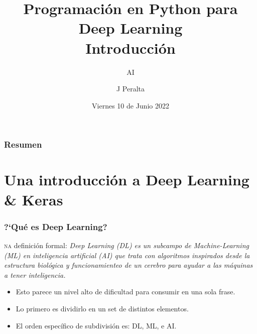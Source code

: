 \documentclass[9pt, xcolor=svgnames, dvipsnames]{beamer}
\title[\mycode]{Programación en Python para Deep Learning\\ Introducción}
\subtitle{AI}
\begin{document}



\author{J Peralta} %
\date{Viernes 10 de Junio 2022}

\begin{frame}
\titlepage %
\end{frame}

\begin{frame}
\frametitle{Resumen} %
\tableofcontents %
\end{frame}



%
%
%
\section{Una introducci\'on a Deep Learning \& Keras}

\begin{frame}[fragile]
\frametitle{?`Qu\'e es Deep Learning?}
\lettrine[lines=3]{\gothfamily\fontsize{50}{60}}{na} definici\'on formal: \textit{Deep Learning (DL) es un subcampo de Machine-Learning (ML) en inteligencia artificial (AI) que trata con algoritmos inspirados desde la estructura biol\'ogica y funcionamienteo de un cerebro para ayudar a las m\'aquinas a tener inteligencia.}
\begin{itemize}
    \item Esto parece un nivel alto de dificultad para consumir en una sola frase.
    \item Lo primero es dividirlo en un set de distintos elementos.
    \item El orden espec\'ifico de subdivisi\'on es: DL, ML, e AI.
\end{itemize}
\end{frame}
\end{document}
